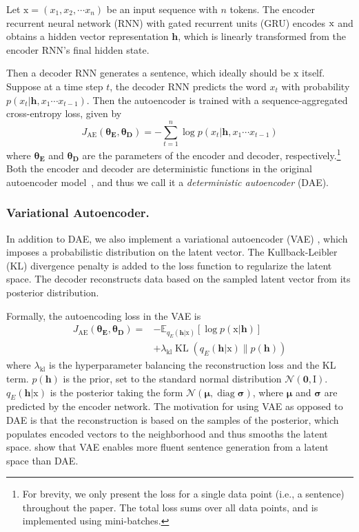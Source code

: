 \documentclass[letterpaper]{article} %
\newcommand{\rmx}{\mathrm x}
\newcommand{\loss}[1]{J_{\text{#1}}}
\newcommand{\hyp}[1]{\lambda_{\text{#1}}}
\newcommand{\nnweight}[1]{\bm{\theta_{\text{#1}}}}
\begin{document}
Let $\rmx=(x_1, x_2, \cdots x_n)$ be an input sequence with $n$ tokens.
The encoder recurrent neural network (RNN) with gated recurrent units (GRU) \cite{cho2014learning} encodes $\rm x$ and obtains a hidden vector representation $\bm h$, which is linearly transformed from the encoder RNN's final hidden state.

Then a decoder RNN generates a sentence, which ideally should be $\rmx$ itself.
Suppose at a time step $t$, the decoder RNN predicts the word $x_t$ with probability $p(x_t|\bm h, x_1\cdots x_{t-1})$. Then the autoencoder is trained with a sequence-aggregated cross-entropy loss, given by
\begin{equation}\label{eqn:ae}
	\loss{AE}(\nnweight{E},\nnweight{D})= -\sum_{t=1}^n \log p(x_t|\bm h, x_1\cdots x_{t-1})
\end{equation}
where $\nnweight{E}$ and $\nnweight{D}$ are the parameters of the encoder and decoder, respectively.\footnote{For brevity, we only present the loss for a single data point (i.e., a sentence) throughout the paper. The total loss sums over all data points, and is implemented using mini-batches.} Both the encoder and decoder are deterministic functions in the original autoencoder model~\cite{rumelhart1985learning}, and thus we call it a \textit{deterministic autoencoder} (DAE).


\subsubsection{Variational Autoencoder.}

In addition to DAE, we also implement a variational autoencoder (VAE) \cite{kingma2013auto}, which imposes a probabilistic distribution on the latent vector. The Kullback-Leibler (KL) divergence \cite{kullback1951information} penalty is added to the loss function to regularize the latent space. The decoder reconstructs data based on the sampled latent vector from its posterior distribution.

Formally, the autoencoding loss in the VAE is
\begin{align}\label{eqn:vae}
	\loss{AE}(\nnweight{E}, \nnweight{D}) = & - \mathbb{E}_{q_{E}(\bm h|\rmx)} [\log p(\rmx|\bm h)]  \nonumber \\
	                                        & + \hyp{kl}\operatorname{KL}(q_{E}(\bm h|\rmx)\|p(\bm h))
\end{align}
where $\hyp{kl}$ is the hyperparameter balancing the reconstruction loss and the KL term. $p(\bm h)$ is the prior, set to the standard normal distribution $\mathcal{N}(\bm 0,\mathrm I)$. $q_E(\bm h|\mathrm x)$ is the posterior taking the form $\mathcal{N}(\bm \mu,\operatorname{diag} \bm\sigma)$, where $\bm\mu$ and $\bm\sigma$ are predicted by the encoder network.
The motivation for using VAE as opposed to DAE is that the reconstruction is based on the samples of the posterior, which populates encoded vectors to the neighborhood and thus smooths the latent space.
\citet{bowman2016generating} show that VAE enables more fluent sentence generation from a latent space than DAE.
\end{document}
